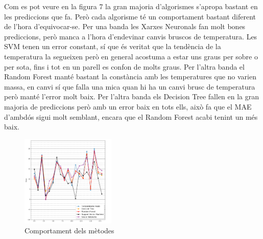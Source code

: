 \documentclass[10pt,a4paper,twocolumn,twoside]{article}
\begin{document}
Com es pot veure en la figura 7 la gran majoria d'algorismes s'apropa bastant en les prediccions que fa. Però cada algorisme té un comportament bastant diferent de l'hora d'equivocar-se. Per una banda les Xarxes Neuronals fan molt bones prediccions, però manca a l'hora d'endevinar canvis bruscos de temperatura. Les SVM tenen un error constant, sí que és veritat que la tendència de la temperatura la segueixen però en general acostuma a estar uns graus per sobre o per sota, fins i tot en un parell es confon de molts graus.
Per l'altra banda el Random Forest manté bastant la constància amb les temperatures que no varien massa, en canvi sí que falla una mica quan hi ha un canvi brusc de temperatura però manté l'error molt baix. Per l'altra banda els Decision Tree fallen en la gran majoria de prediccions però amb un error baix en tots ells, això fa que el MAE d'ambdós sigui molt semblant, encara que el Random Forest acabi tenint un més baix.

\begin{figure}[!h]
\centering
	\includegraphics[width=0.4\textwidth]{../img/comparacioAlgs}
	\caption{Comportament dels mètodes}
	\label{fig-temps}
\end{figure}
\end{document}
